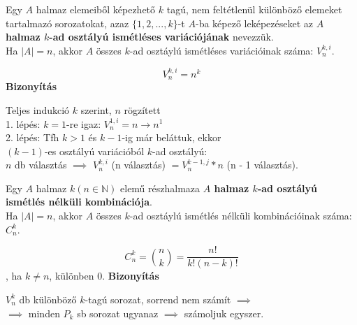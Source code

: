 \begin{frame}
  \begin{tcolorbox}[title={Def.: Ismétléses Variáció}]
    Egy $A$ halmaz elemeiből képezhető $k$ tagú, nem feltétlenül különböző elemeket tartalmazó sorozatokat, azaz $\{ 1, 2, ..., k \}$-t $A$-ba képező leképezéseket az \textbf{$A$ halmaz  $k$-ad osztályú ismétléses variációjának} nevezzük.\\
    Ha $|A| = n$, akkor $A$ összes $k$-ad osztáylú ismétléses variációinak száma: $V_n^{k, i}$.
  \end{tcolorbox}

  \begin{tcolorbox}[title={Tétel: Ismétléses variációk száma}]
    $$V_n^{k, i} = n^k$$
  \tcblower
    \textbf{Bizonyítás}\\
    \mmedskip

    Teljes indukció $k$ szerint, $n$ rögzített\\
    1. lépés: $k = 1$-re igaz: $V_n^{1, i} = n \rightarrow n^1$\\
    2. lépés: Tfh $k > 1$ és $k - 1$-ig már beláttuk, ekkor\\
    $(k - 1)$-es osztályú variációból $k$-ad osztályú:\\
    $n$ db választás $\implies$ $V_n^{k, i}$ (n választás) $= V_n^{k - 1, j} * n$ (n - 1 választás).
  \end{tcolorbox}
\end{frame}

\begin{frame}
  \begin{tcolorbox}[title={Def.: Ismétlés nélküli Kombináció}]
    Egy $A$ halmaz $k (n \in \mathbb{N})$ elemű részhalmaza \textbf{$A$ halmaz  $k$-ad osztályú ismétlés nélküli kombinációja}.\\
    Ha $|A| = n$, akkor $A$ összes $k$-ad osztáylú ismétlés nélküli kombinációinak száma: $C_n^k$.
  \end{tcolorbox}

  \begin{tcolorbox}[title={Tétel: Kombinációk száma}]
    $$C_n^k = {{n}\choose{k}} = \frac{n!}{k!(n - k)!} $$, ha $k \neq n$, különben 0.
  \tcblower
    \textbf{Bizonyítás}\\
    \mmedskip

    $V_n^k$ db különböző $k$-tagú sorozat, sorrend nem számít $\implies$\\
    $\implies$ minden $P_k$ sb sorozat ugyanaz $\implies$ számoljuk egyszer.\\
  \end{tcolorbox}
\end{frame}

